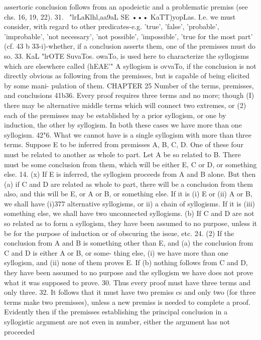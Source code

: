 {{{{{{{{{{{{{assertoric conclusion follows from an apodeictic and a problematic
premiss (see chs. 16, 19, 22).
31. ~"lrLaKlhl,aa9aL SE ••• KaTT)yopLas. I.e. we must consider,
with regard to other predicates-e.g. 'true', 'false', 'probable',
'improbable', 'not necessary', 'not possible', 'impossible', 'true
for the most part' (cf. 43 b 33-{i)-whether, if a conclusion asserts
them, one of the premisses must do so.
33. KaL "lrOTE SuvaTos. owaTo, is used here to characterize the
syllogisms which are elsewhere called (hEAE'" A syllogism is
ovvaTo, if the conclusion is not directly obvious as following from
the premisses, but is capable of being elicited by some mani-
pulation of them.
CHAPTER 25
Number of the terms, premisses, and conclusions
41b36. Every proof requires three terms and no more; though
(I) there may be alternative middle terms which will connect two
extremes, or (2) each of the premisses may be established by a
prior syllogism, or one by induction, the other by syllogism. In
both these cases we have more than one syllogism.
42"6. What we cannot have is a single syllogism with more than
three terms. Suppose E to be inferred from premisses A, B, C, D.
One of these four must be related to another as whole to part. Let
A be so related to B. There must be some conclusion from them,
which will be either E, C or D, or something else.
14. (x) If E is inferred, the syllogism proceeds from A and B
alone. But then (a) if C and D are related as whole to part, there
will be a conclusion from them also, and this will be E, or A or B,
or something else. If it is (i) E or (ii) A or B, we shall have (i)377
alternative syllogisms, or {ii) a chain of syllogisms. If it is (iii)
something else, we shall have two unconnected syllogisms. (b) If
C and D are not so related as to form a syllogism, they have been
assumed to no purpose, unless it be for the purpose of induction
or of obscuring the issue, etc.
24. (2) If the conclusion from A and B is something other than
E, and (a) the conclusion from C and D is either A or B, or some-
thing else, (i) we have more than one syllogism, and (ii) none of
them proves E. If (b) nothing follows from C and D, they have
been assumed to no purpose and the syllogism we have does not
prove what it was supposed to prove.
30. Thus every proof must have three terms and only three.
32. It follows that it must have two premiss cs and only two
(for three terms make two premisses), unless a new premiss is
needed to complete a proof. Evidently then if the premisses
establishing the principal conclusion in a syllogistic argument are
not even in number, either the argument has not proceeded
}}}}}}}}}}}}}}}
